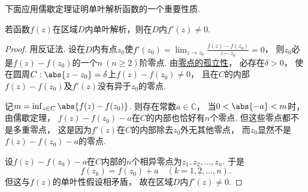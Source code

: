 下面应用儒歇定理证明单叶解析函数的一个重要性质.
\begin{theorem}%
若函数\(f(z)\)在区域\(D\)内单叶解析，则在\(D\)内\(f'(z)\neq0\).
\begin{proof}
用反证法.
设在\(D\)内有点\(z_0\)使\(f'(z_0)=\lim_{z \to z_0} \frac{f(z)-f(z_0)}{z-z_0}=0\)，
则\(z_0\)必是\(f(z)-f(z_0)\)的一个\(n\ (n\geq2)\)阶零点.
由\hyperref[theorem:解析函数的级数表示.解析函数的零点的孤立性]{零点的孤立性}，
必存在\(\delta>0\)，
使在圆周\(C: \abs{z-z_0}=\delta\)上\(f(z)-f(z_0)\neq0\)，
且在\(C\)的内部\(f(z)-f(z_0)\)及\(f'(z)\)没有异于\(z_0\)的零点.

记\(m = \inf_{z \in C} \abs{f(z) - f(z_0)}\).
则存在常数\(a\in\mathbb{C}\)，
当\(0<\abs{-a}<m\)时，
由儒歇定理，
\(f(z)-f(z_0)-a\)在\(C\)的内部也恰好有\(n\)个零点.
但这些零点都不是多重零点，
这是因为\(f'(z)\)在\(C\)的内部除去\(z_0\)外无其他零点，
而\(z_0\)显然不是\(f(z)-f(z_0)-a\)的零点.

设\(f(z)-f(z_0)-a\)在\(C\)内部的\(n\)个相异零点为\(z_1,z_2,\dotsc,z_n\).
于是\[
	f(z_k) = f(z_0) + a \quad(k=1,2,\dotsc,n).
\]
但这与\(f(z)\)的单叶性假设相矛盾，
故在区域\(D\)内\(f'(z)\neq0\).
\end{proof}
\end{theorem}
